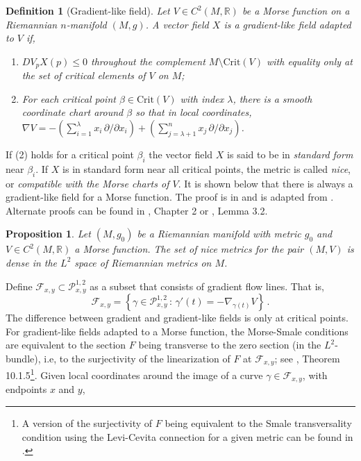 \documentclass[12pt]{article}
\newtheorem{proposition}[theorem]{Proposition}
\newtheorem{definition}[theorem]{Definition}
\begin{document}
\begin{definition}[Gradient-like field]
    Let $V \in C^2(M ,\mathbb{R})$ be a Morse function on a Riemannian $n$-manifold $(M,g)$. A vector field $X$ is a \textit{gradient-like field adapted to $V$} if,
    \begin{enumerate}[itemsep=0pt]
        \item $DV_pX(p) \leq 0$ throughout the complement $M \setminus \text{Crit}(V)$ with equality only at the set of critical elements of $V$ on $M$;
        \item For each critical point $\beta \in \text{Crit}(V)$ with index $\lambda$, there is a smooth coordinate chart around $\beta$ so that in local coordinates, $\nabla V = - \left(\sum_{i=1}^{\lambda} x_i \, \partial/\partial x_i \right) + \left( \sum_{j={\lambda+1}}^{n} x_j \, \partial/\partial x_j\right)$.
    \end{enumerate}
\end{definition}
If (2) holds for a critical point $\beta_i$ the vector field $X$ is said to be in \textit{standard form} near $\beta_i$. If $X$ is in standard form near all critical points, the metric is called \textit{nice}, or \textit{compatible with the Morse charts of $V$}. It is shown below that there is always a gradient-like field for a Morse function. The proof is in  and is adapted from \cite{cohennotes}. Alternate proofs can be found in \cite{audin2014morse}, Chapter 2 or \cite{milnor2025lectures}, Lemma 3.2.
\begin{proposition}
\label{proposition:nice-metrics-dense}
     Let $(M,g_0)$ be a Riemannian manifold with metric $g_0$ and $V \in C^2(M, \mathbb{R})$ a Morse function. The set of nice metrics for the pair $(M,V)$ is dense in the $L^2$ space of Riemannian metrics on $M$.
\end{proposition}
\noindent
Define $\mathcal{F}_{x,y} \subset \mathcal{P}^{1,2}_{x,y}$ as a subset that consists of gradient flow lines. That is,
\begin{equation*}
    \mathcal{F}_{x,y} = \left\{ \gamma\in  \mathcal{P}^{1,2}_{x,y} \, : \,  \gamma'(t) = -\nabla_{\gamma(t)} V \right\} \,.
\end{equation*}
The difference between gradient and gradient-like fields is only at critical points. For gradient-like fields adapted to a Morse function, the Morse-Smale conditions are equivalent to the section $F$ being transverse to the zero section (in the $L^2$-bundle), i.e, to the surjectivity of the linearization of $F$ at $\mathcal{F}_{x,y}$; see \cite{audin2014morse}, Theorem 10.1.5\footnote{A version of the surjectivity of $F$ being equivalent to the Smale transversality condition using the Levi-Cevita connection for a given metric can be found in \cite{hutchings2002lecture}.}. Given local coordinates around the image of a curve $\gamma \in \mathcal{F}_{x,y}$, with endpoints $x$ and $y$,
\end{document}
